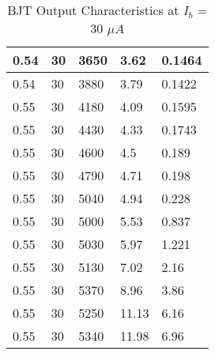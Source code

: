 \documentclass{scrartcl}
\newcommand{\1}{\mathbbm{1}}
\begin{document}
\begin{table}[!ht]
\begin{tabular}{|l|l|l|l|l|}
        0.54 & 30 & 3650 & 3.62 & 0.1464 \\ \hline
        0.54 & 30 & 3880 & 3.79 & 0.1422 \\ \hline
        0.55 & 30 & 4180 & 4.09 & 0.1595 \\ \hline
        0.55 & 30 & 4430 & 4.33 & 0.1743 \\ \hline
        0.55 & 30 & 4600 & 4.5 & 0.189 \\ \hline
        0.55 & 30 & 4790 & 4.71 & 0.198 \\ \hline
        0.55 & 30 & 5040 & 4.94 & 0.228 \\ \hline
        0.55 & 30 & 5000 & 5.53 & 0.837 \\ \hline
        0.55 & 30 & 5030 & 5.97 & 1.221 \\ \hline
        0.55 & 30 & 5130 & 7.02 & 2.16 \\ \hline
        0.55 & 30 & 5370 & 8.96 & 3.86 \\ \hline
        0.55 & 30 & 5250 & 11.13 & 6.16 \\ \hline
        0.55 & 30 & 5340 & 11.98 & 6.96 \\ \hline
    \end{tabular}
    \caption{BJT Output Characteristics at $I_b$ = 30 $\mu A$}
    \label{tab:output30}
\end{table}
\end{document}
